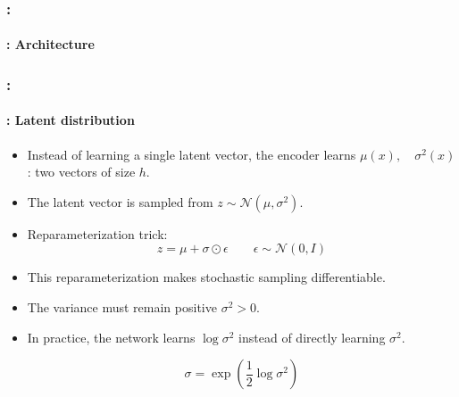 \documentclass[xcolor=table]{beamer}
\begin{document}
	\begin{frame}
		\frametitle{\insertshortsubtitle: \insertsection}
		\framesubtitle{\insertsubsection: Architecture}
		
		
	\end{frame}
	
	
	\begin{frame}
		\frametitle{\insertshortsubtitle: \insertsection}
		\framesubtitle{\insertsubsection: Latent distribution}
		
		\begin{itemize}
			\item Instead of learning a single latent vector, the encoder learns
			$\mu(x), \quad \sigma^2(x)$: two vectors of size $h$.
			
			\item The latent vector is sampled from $z \sim \mathcal{N}(\mu, \sigma^2)$.
			
			\item Reparameterization trick:
			\[
			z = \mu + \sigma \odot \epsilon \quad\quad \epsilon \sim \mathcal{N}(0, I)
			\]
			
			\item This reparameterization makes stochastic sampling differentiable.
			
			\item The variance must remain positive $\sigma^2 > 0$.
			
			\item In practice, the network learns $\log \sigma^2$ instead of directly learning $\sigma^2$.
			
			\[\sigma = \exp\left(\frac{1}{2}\log \sigma^2\right)\]
			
		\end{itemize}
		
	\end{frame}
	
\end{document}
